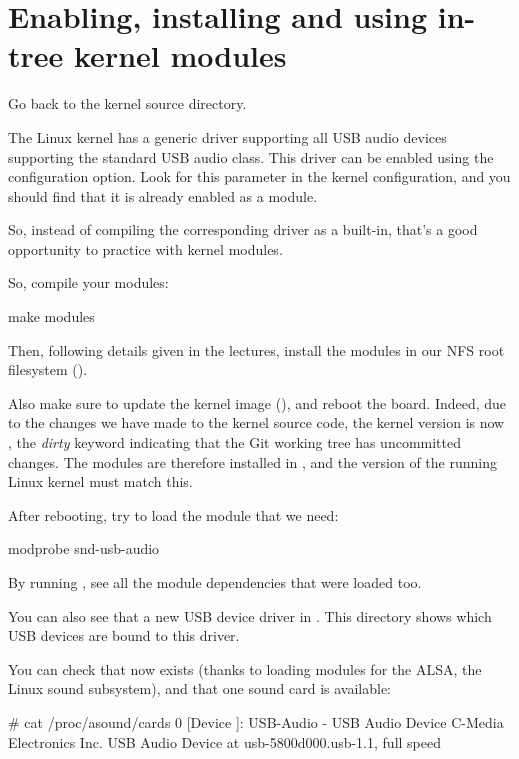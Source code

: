 {\section{Enabling, installing and using in-tree kernel modules}

Go back to the kernel source directory.

The Linux kernel has a generic driver supporting all USB audio devices
supporting the standard USB audio class. This driver can be enabled
using the  configuration option. Look
for this parameter in the kernel configuration, and you should find
that it is already enabled as a module.

So, instead of compiling the corresponding driver as a built-in, that's
a good opportunity to practice with kernel modules.

So, compile your modules:
\begin{bashinput}
make modules
\end{bashinput}

Then, following details given in the lectures, install the modules in our NFS
root filesystem ().

Also make sure to update the kernel image (), and reboot the
board.  Indeed, due to the changes we have made to the kernel source code,
the kernel version is now , the {\em dirty}
keyword indicating that the Git working tree has uncommitted changes.
The modules are therefore installed in ,
and the version of the running Linux kernel must match this.

After rebooting, try to load the module that we need:

\begin{bashinput}
modprobe snd-usb-audio
\end{bashinput}

By running , see all the module dependencies that
were loaded too.

You can also see that a new USB device driver in
. This directory shows which
USB devices are bound to this driver.

You can check that  now exists (thanks to loading
modules for the ALSA, the Linux sound subsystem), and that one sound
card is available:

\begin{bashinput}
# cat /proc/asound/cards
 0 [Device         ]: USB-Audio - USB Audio Device
                      C-Media Electronics Inc. USB Audio Device at usb-5800d000.usb-1.1, full speed
\end{bashinput}

}
